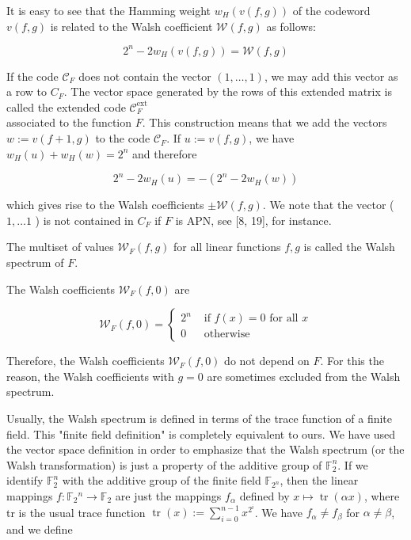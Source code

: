 \documentclass[10pt]{article}
\begin{document}
It is easy to see that the Hamming weight $w_{H}(v(f, g))$ of the codeword $v(f, g)$ is related to the Walsh coefficient $\mathcal{W}(f, g)$ as follows:

$$
2^{n}-2 w_{H}(v(f, g))=\mathcal{W}(f, g)
$$

If the code $\mathcal{C}_{F}$ does not contain the vector $(1, \ldots, 1)$, we may add this vector as a row to $C_{F}$. The vector space generated by the rows of this extended matrix is called the extended code $\mathcal{C}_{F}^{\text {ext }}$\\
associated to the function $F$. This construction means that we add the vectors $w:=v(f+1, g)$ to the code $\mathcal{C}_{F}$. If $u:=v(f, g)$, we have $w_{H}(u)+w_{H}(w)=2^{n}$ and therefore

$$
2^{n}-2 w_{H}(u)=-\left(2^{n}-2 w_{H}(w)\right)
$$

which gives rise to the Walsh coefficients $\pm \mathcal{W}(f, g)$. We note that the vector ( $1, \ldots 1$ ) is not contained in $C_{F}$ if $F$ is APN, see [8, 19], for instance.

The multiset of values $\mathcal{W}_{F}(f, g)$ for all linear functions $f, g$ is called the Walsh spectrum of $F$.

The Walsh coefficients $\mathcal{W}_{F}(f, 0)$ are

$$
\mathcal{W}_{F}(f, 0)= \begin{cases}2^{n} & \text { if } f(x)=0 \text { for all } x \\ 0 & \text { otherwise }\end{cases}
$$

Therefore, the Walsh coefficients $\mathcal{W}_{F}(f, 0)$ do not depend on $F$. For this the reason, the Walsh coefficients with $g=0$ are sometimes excluded from the Walsh spectrum.

Usually, the Walsh spectrum is defined in terms of the trace function of a finite field. This "finite field definition" is completely equivalent to ours. We have used the vector space definition in order to emphasize that the Walsh spectrum (or the Walsh transformation) is just a property of the additive group of $\mathbb{F}_{2}^{n}$. If we identify $\mathbb{F}_{2}^{n}$ with the additive group of the finite field $\mathbb{F}_{2^{n}}$, then the linear mappings $f: \mathbb{F}_{2}{ }^{n} \rightarrow \mathbb{F}_{2}$ are just the mappings $f_{\alpha}$ defined by $x \mapsto \operatorname{tr}(\alpha x)$, where tr is the usual trace function $\operatorname{tr}(x):=\sum_{i=0}^{n-1} x^{2^{i}}$. We have $f_{\alpha} \neq f_{\beta}$ for $\alpha \neq \beta$, and we define
\end{document}
